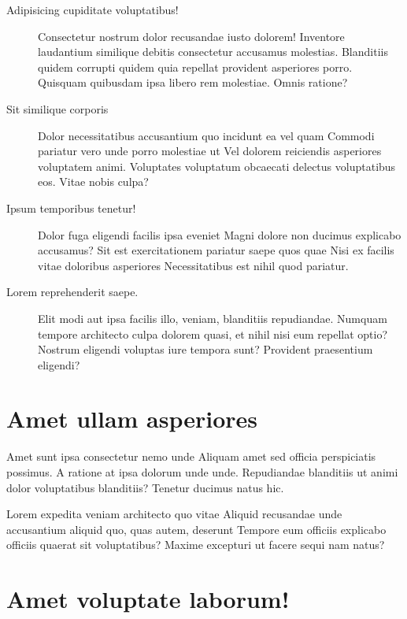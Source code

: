 \documentclass[
    14pt,
    letterpaper,
]{extreport}
\begin{document}
\begin{description}
    \item [Adipisicing cupiditate voluptatibus!]

    Consectetur nostrum dolor recusandae iusto dolorem! Inventore laudantium similique debitis consectetur accusamus molestias. Blanditiis quidem corrupti quidem quia repellat provident asperiores porro. Quisquam quibusdam ipsa libero rem molestiae. Omnis ratione?

    \item [Sit similique corporis]
    
    Dolor necessitatibus accusantium quo incidunt ea vel quam Commodi pariatur vero unde porro molestiae ut Vel dolorem reiciendis asperiores voluptatem animi. Voluptates voluptatum obcaecati delectus voluptatibus eos. Vitae nobis culpa?

    \item [Ipsum temporibus tenetur!]

    Dolor fuga eligendi facilis ipsa eveniet Magni dolore non ducimus explicabo accusamus? Sit est exercitationem pariatur saepe quos quae Nisi ex facilis vitae doloribus asperiores Necessitatibus est nihil quod pariatur.

    \item [Lorem reprehenderit saepe.]

    Elit modi aut ipsa facilis illo, veniam, blanditiis repudiandae. Numquam tempore architecto culpa dolorem quasi, et nihil nisi eum repellat optio? Nostrum eligendi voluptas iure tempora sunt? Provident praesentium eligendi?
\end{description}

\section{Amet ullam asperiores}

Amet sunt ipsa consectetur nemo unde Aliquam amet sed officia perspiciatis possimus. A ratione at ipsa dolorum unde unde. Repudiandae blanditiis ut animi dolor voluptatibus blanditiis? Tenetur ducimus natus hic.

Lorem expedita veniam architecto quo vitae Aliquid recusandae unde accusantium aliquid quo, quas autem, deserunt Tempore eum officiis explicabo officiis quaerat sit voluptatibus? Maxime excepturi ut facere sequi nam natus?

\section{Amet voluptate laborum!}
\end{document}
